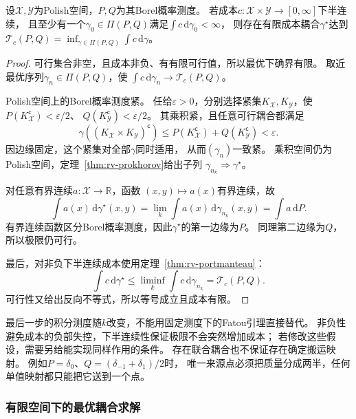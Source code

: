 \begin{theorem}[最优耦合存在]
\label{thm:information-optimal-coupling-existence}
设\(\mathcal X,\mathcal Y\)为Polish空间，\(P,Q\)为其Borel概率测度。
若成本\(c:\mathcal X\times\mathcal Y\to[0,\infty]\)下半连续，
且至少有一个\(\gamma_0\in\Pi(P,Q)\)满足\(\int c\,\mathrm d\gamma_0<\infty\)，
则存在有限成本耦合\(\gamma^\star\)达到
\(\mathcal T_c(P,Q)=\inf_{\gamma\in\Pi(P,Q)}\int c\,\mathrm d\gamma\)。
\end{theorem}
\begin{proof}
可行集合非空，且成本非负、有有限可行值，所以最优下确界有限。
取近最优序列\(\gamma_n\in\Pi(P,Q)\)，使
\(\int c\,\mathrm d\gamma_n\to\mathcal T_c(P,Q)\)。

Polish空间上的Borel概率测度紧。
任给\(\varepsilon>0\)，分别选择紧集\(K_{\mathcal X},K_{\mathcal Y}\)，使
\(P(K_{\mathcal X}^{\mathsf c})<\varepsilon/2\)、
\(Q(K_{\mathcal Y}^{\mathsf c})<\varepsilon/2\)。
其乘积紧，且任意可行耦合都满足
\[
  \gamma((K_{\mathcal X}\times K_{\mathcal Y})^{\mathsf c})
  \leq P(K_{\mathcal X}^{\mathsf c})+Q(K_{\mathcal Y}^{\mathsf c})
  <\varepsilon.
\]
因边缘固定，这个紧集对全部\(\gamma\)同时适用，
从而\((\gamma_n)\)一致紧。
乘积空间仍为Polish空间，定理~\ref{thm:rv-prokhorov}给出子列
\(\gamma_{n_k}\Rightarrow\gamma^\star\)。

对任意有界连续\(a:\mathcal X\to\mathbb R\)，函数
\((x,y)\mapsto a(x)\)有界连续，故
\[
  \int a(x)\,\mathrm d\gamma^\star(x,y)
  =\lim_k\int a(x)\,\mathrm d\gamma_{n_k}(x,y)=\int a\,\mathrm dP.
\]
有界连续函数区分Borel概率测度，因此\(\gamma^\star\)的第一边缘为\(P\)。
同理第二边缘为\(Q\)，所以极限仍可行。

最后，对非负下半连续成本使用定理~\ref{thm:rv-portmanteau}：
\[
  \int c\,\mathrm d\gamma^\star
  \leq\liminf_k\int c\,\mathrm d\gamma_{n_k}
  =\mathcal T_c(P,Q).
\]
可行性又给出反向不等式，所以等号成立且成本有限。
\end{proof}

最后一步的积分测度随\(k\)改变，不能用固定测度下的Fatou引理直接替代。
非负性避免成本的负部失控，下半连续性保证极限不会突然增加成本；
若修改这些假设，需要另给能实现同样作用的条件。
存在联合耦合也不保证存在确定搬运映射。
例如\(P=\delta_0\)、\(Q=(\delta_{-1}+\delta_1)/2\)时，
唯一来源点必须把质量分成两半，任何单值映射都只能把它送到一个点。

\subsubsection{有限空间下的最优耦合求解}
\label{sec:information-finite-transport}

